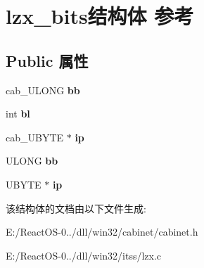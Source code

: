 \hypertarget{structlzx__bits}{}\section{lzx\+\_\+bits结构体 参考}
\label{structlzx__bits}
\subsection*{Public 属性}
\begin{DoxyCompactItemize}
\item 
\mbox{\label{structlzx__bits_a6dea5ce1d63b5d9008bddca37ca561b0}} 
cab\+\_\+\+U\+L\+O\+NG {\bfseries bb}
\item 
\mbox{\label{structlzx__bits_ad55a2d6803827024344eac4fc4d75bdc}} 
int {\bfseries bl}
\item 
\mbox{\label{structlzx__bits_a6babf2c5babfa91e527dbee3ce4293aa}} 
cab\+\_\+\+U\+B\+Y\+TE $\ast$ {\bfseries ip}
\item 
\mbox{\label{structlzx__bits_a3ef2bd3d8c605d2c925079e809fd4b71}} 
U\+L\+O\+NG {\bfseries bb}
\item 
\mbox{\label{structlzx__bits_aa88182fa32f6f22d3d323acf328f7d94}} 
U\+B\+Y\+TE $\ast$ {\bfseries ip}
\end{DoxyCompactItemize}


该结构体的文档由以下文件生成\+:\begin{DoxyCompactItemize}
\item 
E\+:/\+React\+O\+S-\/0../dll/win32/cabinet/cabinet.\+h\item 
E\+:/\+React\+O\+S-\/0../dll/win32/itss/lzx.\+c\end{DoxyCompactItemize}
